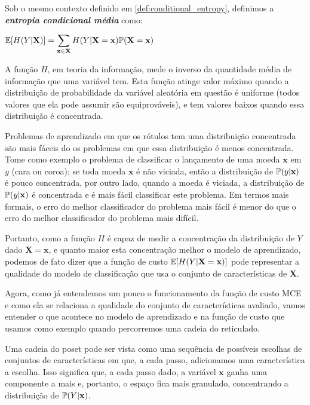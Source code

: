\begin{mydefinition}
Sob o mesmo contexto definido em \ref{def:conditional_entropy}, 
definimos a {\bf \em entropia condicional média} como:
\begin{center}
$
\begin{aligned}
    \mathbb{E}[H (Y | \mathbf{X})] = 
    \sum_{\mathbf{x} \in \mathbf{X}} H (Y | \mathbf{X = x}) \mathbb{P} (\mathbf{X = x})
\end{aligned}
$
\end{center}
\end{mydefinition}


A função $H$, em teoria da informação, mede o inverso da quantidade 
média de informação que uma variável tem. Esta função atinge valor 
máximo quando a distribuição de probabilidade da variável aleatória em
questão é uniforme (todos valores que ela pode assumir são 
equiprováveis), e tem valores baixos quando essa distribuição é 
concentrada. 

Problemas de aprendizado em que os rótulos tem uma distribuição 
concentrada são mais fáceis do os problemas em que essa distribuição é 
menos concentrada. Tome como exemplo o problema de
classificar o lançamento de uma moeda $\mathbf{x}$ em $y$ (cara ou 
coroa); se toda moeda $\mathbf{x}$ é não viciada, então a distribuição
de $\mathbb{P} (y | \mathbf{x})$ é pouco concentrada, por outro lado,
quando a moeda é viciada, a distribuição de 
$\mathbb{P} (y | \mathbf{x})$ é concentrada e é mais fácil 
classificar este problema. Em termos mais formais, o erro do melhor 
classificador do problema mais fácil é menor do que o erro do melhor 
classificador do problema mais difícil.

Portanto, como a função $H$ é capaz de medir a concentração da 
distribuição de $Y$ dado $\mathbf{X = x}$, e quanto maior esta 
concentração melhor o modelo de aprendizado, podemos de fato dizer que a
função de custo $\mathbb{E}[H (Y | \mathbf{X = x})]$ pode representar
a qualidade do modelo de classificação que usa o conjunto de 
características de $\mathbf{X}$.

Agora, como já entendemos um pouco o funcionamento da função de custo
MCE e como ela se relaciona a qualidade do conjunto de características 
avaliado, vamos entender o que acontece no modelo de aprendizado e na 
função de custo que usamos como exemplo quando percorremos uma cadeia
do reticulado. 

Uma cadeia do poset pode ser vista como uma sequência de possíveis
escolhas de conjuntos de características em que, a cada passo, 
adicionamos uma característica a escolha. Isso significa que, a cada 
passo dado, a variável $\mathbf{x}$ ganha uma componente a mais e,
portanto, o espaço fica mais granulado, concentrando a distribuição de 
$\mathbb{P} (Y | \mathbf{x})$.
